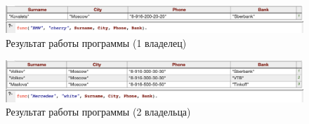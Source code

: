 \documentclass[a4paper,14pt, unknownkeysallowed]{extreport}
\begin{document}
\begin{figure}[h]
	\centering
	\includegraphics[scale=0.5]{img/result1.png}
	\caption{Результат работы программы (1 владелец)}
	\label{fig:result1}
\end{figure}

\begin{figure}[h]
	\centering
	\includegraphics[scale=0.5]{img/result2.png}
	\caption{Результат работы программы (2 владельца)}
	\label{fig:result2}
\end{figure}
\end{document}
